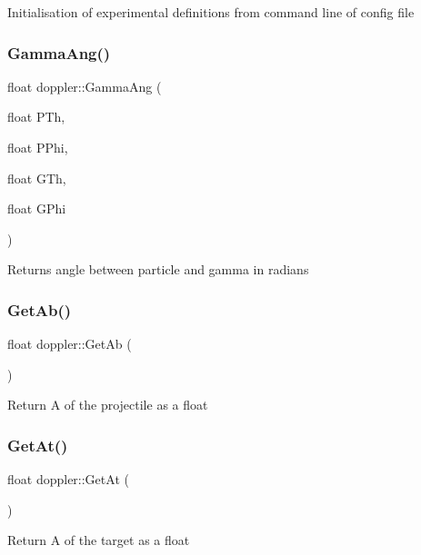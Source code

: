 Initialisation of experimental definitions from command line of config file \mbox{\label{classdoppler_a6dca381f91f2267abefadd62cf66f69f}} 
\subsubsection{\texorpdfstring{Gamma\+Ang()}{GammaAng()}}
{\footnotesize\ttfamily float doppler\+::\+Gamma\+Ang (\begin{DoxyParamCaption}\item[{float}]{P\+Th,  }\item[{float}]{P\+Phi,  }\item[{float}]{G\+Th,  }\item[{float}]{G\+Phi }\end{DoxyParamCaption})}

Returns angle between particle and gamma in radians \mbox{\label{classdoppler_a364b85a1e3be8f5386dab5f0b6fe2da3}} 
\subsubsection{\texorpdfstring{Get\+Ab()}{GetAb()}}
{\footnotesize\ttfamily float doppler\+::\+Get\+Ab (\begin{DoxyParamCaption}{ }\end{DoxyParamCaption})}

Return A of the projectile as a float \mbox{\label{classdoppler_aef253058a4cae5ab5c6b2662d6afb39d}} 
\subsubsection{\texorpdfstring{Get\+At()}{GetAt()}}
{\footnotesize\ttfamily float doppler\+::\+Get\+At (\begin{DoxyParamCaption}{ }\end{DoxyParamCaption})}

Return A of the target as a float \mbox{\label{classdoppler_a182d987ddc6db4a8b8e7f7821bda3846}} 
